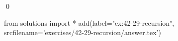 
\begin{ex}
  \label{ex:42-29-recursion}
  
  \qed
\end{ex}
\begin{python0}
from solutions import *
add(label="ex:42-29-recursion",
    srcfilename='exercises/42-29-recursion/answer.tex')
\end{python0}

